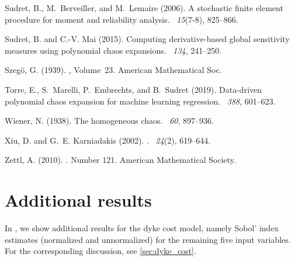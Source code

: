 \documentclass[a4paper,11pt]{article}
\theoremstyle{definition}
\theoremstyle{remark}
\theoremstyle{theorem}
\begin{document}
\begin{thebibliography}{}
	{Sudret}, B., M.~{Berveiller}, and M.~{Lemaire} (2006).
	\newblock A stochastic finite element procedure for moment and reliability
	analysis.
	~{\em 15\/}(7-8), 825--866.
	
	Sudret, B. and C.-V. Mai (2015).
	\newblock Computing derivative-based global sensitivity measures using
	polynomial chaos expansions.
	~{\em 134},
	241--250.
	
	Szeg\"o, G. (1939).
	, Volume~23.
	\newblock American Mathematical Soc.
	
	Torre, E., S.~Marelli, P.~Embrechts, and B.~Sudret (2019).
	\newblock Data-driven polynomial chaos expansion for machine learning
	regression.
	~{\em 388}, 601--623.
	
	Wiener, N. (1938).
	\newblock The homogeneous chaos.
	~{\em 60}, 897--936.
	
	Xiu, D. and G.~E. Karniadakis (2002).
	.
	~{\em 24\/}(2), 619--644.
	
	Zettl, A. (2010).
	.
	\newblock Number 121. American Mathematical Society.
	
\end{thebibliography}



\clearpage

\appendix

\section{Additional results}
In , we show additional results for the dyke cost model, namely Sobol' index estimates (normalized and unnormalized) for the remaining five input variables.
For the corresponding discussion, see \cref{sec:dyke_cost}.
\end{document}
